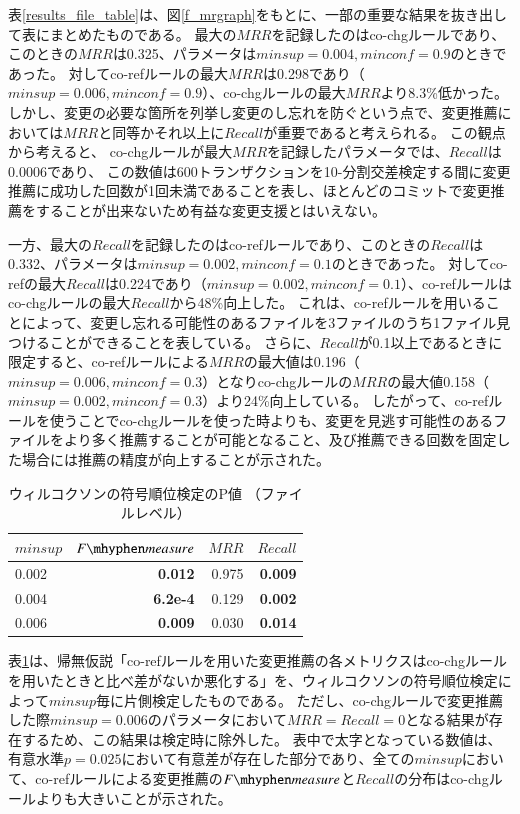 \documentclass[a4paper]{jsbook}
\newcommand{\minconf}{mincon\!f}
\newcommand{\fmeasure}{F\mhyphen measure}
\begin{document}
表\ref{results_file_table}は、図\ref{f_mrgraph}をもとに、一部の重要な結果を抜き出して表にまとめたものである。
最大の$MRR$を記録したのはco-chgルールであり、このときの$MRR$は0.325、パラメータは$minsup=0.004,\minconf=0.9$のときであった。
対してco-refルールの最大$MRR$は0.298であり（$minsup=0.006,\minconf=0.9$）、co-chgルールの最大$MRR$より8.3\%低かった。
しかし、変更の必要な箇所を列挙し変更のし忘れを防ぐという点で、変更推薦においては$MRR$と同等かそれ以上に$Recall$が重要であると考えられる。
この観点から考えると、 co-chgルールが最大$MRR$を記録したパラメータでは、$Recall$は0.0006であり、
この数値は600トランザクションを10-分割交差検定する間に変更推薦に成功した回数が1回未満であることを表し、ほとんどのコミットで変更推薦をすることが出来ないため有益な変更支援とはいえない。

一方、最大の$Recall$を記録したのはco-refルールであり、このときの$Recall$は0.332、パラメータは$minsup=0.002,\minconf=0.1$のときであった。
対してco-refの最大$Recall$は0.224であり（$minsup=0.002,\minconf=0.1$）、co-refルールはco-chgルールの最大$Recall$から48\%向上した。
これは、co-refルールを用いることによって、変更し忘れる可能性のあるファイルを3ファイルのうち1ファイル見つけることができることを表している。
さらに、$Recall$が0.1以上であるときに限定すると、co-refルールによる$MRR$の最大値は0.196（$minsup=0.006,\minconf=0.3$）となりco-chgルールの$MRR$の最大値0.158（$minsup=0.002,\minconf=0.3$）より24\%向上している。
したがって、co-refルールを使うことでco-chgルールを使った時よりも、変更を見逃す可能性のあるファイルをより多く推薦することが可能となること、及び推薦できる回数を固定した場合には推薦の精度が向上することが示された。

\begin{table}[t]
  \begin{center}
    \caption{ウィルコクソンの符号順位検定のP値 （ファイルレベル）}
    \label{pvalue_file}
    \begin{tabular}{l|rrr}
      \hline
      $minsup$ & $\fmeasure$ & $MRR$ & $Recall$\\
      \hline
      0.002 & {\bf 0.012} & 0.975 & {\bf 0.009}\\
      0.004 & {\bf 6.2e-4} & 0.129 & {\bf 0.002}\\
      0.006 & {\bf 0.009} & 0.030 & {\bf 0.014}\\
      \hline
    \end{tabular}
  \end{center}
\end{table}

表\ref{pvalue_file}は、帰無仮説「co-refルールを用いた変更推薦の各メトリクスはco-chgルールを用いたときと比べ差がないか悪化する」を、ウィルコクソンの符号順位検定によって$minsup$毎に片側検定したものである。
ただし、co-chgルールで変更推薦した際$minsup=0.006$のパラメータにおいて$MRR=Recall=0$となる結果が存在するため、この結果は検定時に除外した。
表中で太字となっている数値は、有意水準$p=0.025$において有意差が存在した部分であり、全ての$minsup$において、co-refルールによる変更推薦の$\fmeasure$と$Recall$の分布はco-chgルールよりも大きいことが示された。
\end{document}
